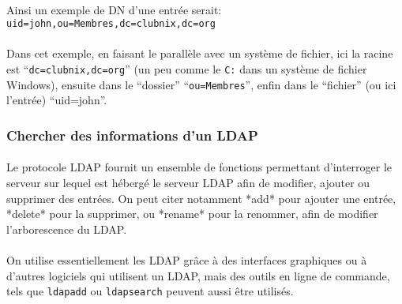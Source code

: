\paragraph{} Ainsi un exemple de DN d'une entrée serait:
\texttt{uid=john,ou=Membres,dc=clubnix,dc=org}

\paragraph{} Dans cet exemple, en faisant le parallèle avec un système de
fichier, ici la racine est ``\texttt{dc=clubnix,dc=org}'' (un peu comme le
\texttt{C:} dans un système de fichier Windows), ensuite dans le ``dossier''
``\texttt{ou=Membres}'', enfin dans le ``fichier'' (ou ici l'entrée)
``uid=john''.

\subsubsection{Chercher des informations d'un LDAP}

\paragraph{} Le protocole LDAP fournit un ensemble de fonctions permettant
d'interroger le serveur sur lequel est hébergé le serveur LDAP afin de
modifier, ajouter ou supprimer des entrées. On peut citer notamment *add* pour
ajouter une entrée, *delete* pour la supprimer, ou *rename* pour la renommer,
afin de modifier l'arborescence du LDAP.

\paragraph{} On utilise essentiellement les LDAP grâce à des interfaces
graphiques ou à d'autres logiciels qui utilisent un LDAP, mais des outils en
ligne de commande, tels que \texttt{ldapadd} ou \texttt{ldapsearch} peuvent
aussi être utilisés.

